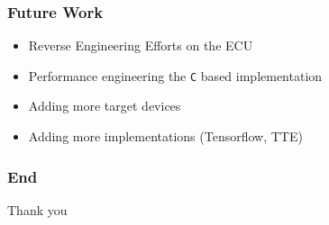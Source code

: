 \documentclass{beamer}
\begin{document}
\begin{frame}
  \frametitle{Future Work}

  \begin{itemize}
    \item Reverse Engineering Efforts on the ECU
    \item Performance engineering the \texttt{C} based implementation
    \item Adding more target devices
    \item Adding more implementations (Tensorflow, TTE)
  \end{itemize}

\end{frame}


\begin{frame}
  \frametitle{End}

  \centerline{{\Large Thank you}}

\end{frame}
\end{document}
